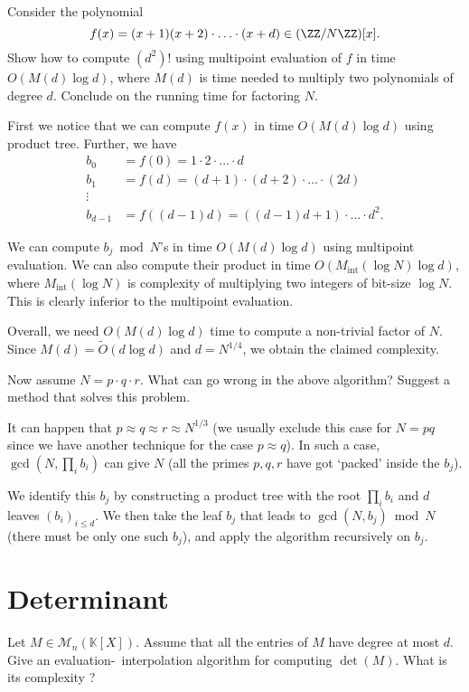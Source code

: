 \documentclass[11pt]{exam}
\theoremstyle{definition}
\begin{document}
{\begin{questions}
  \question Consider the polynomial 
  \[
    f(x) = (x+1)(x+2) \cdot\ldots\cdot  (x+d) \in (\ZZ/N\ZZ)[x].
  \]
  Show how to compute $(d^2)!$ using multipoint evaluation of $f$ in time $O(M(d) \log d)$, where $M(d)$ is time needed to multiply two polynomials of degree $d$. Conclude on the running time for factoring $N$.
  \begin{solution}
    First we notice that we can compute $f(x)$ in time $O(M(d) \log d)$ using product tree. Further, we have
    \begin{align*}
      b_0 & = f(0) = 1 \cdot 2 \cdot\ldots\cdot d \\
      b_1 & = f(d) = (d+1) \cdot (d+2)\cdot \ldots\cdot (2d) \\
      \vdots \\
      b_{d-1} & = f((d-1)d) = ((d-1)d+1)\cdot\ldots\cdot d^2.
    \end{align*}
    
    We can compute $b_j \bmod N$'s in time $O(M(d) \log d)$ using multipoint evaluation. We can also compute their product in time $O(M_{\text{int}}(\log N) \log d)$, where $M_{\text{int}}(\log N)$ is complexity of multiplying two integers of bit-size $\log N$. This is clearly inferior to the multipoint evaluation.
    
    Overall, we need $O(M(d) \log d)$ time to compute a non-trivial factor of $N$. Since $M(d) = \tilde{O}(d \log d)$ and $d=N^{1/4}$, we obtain the claimed complexity.
  \end{solution}

  \question Now assume $N=p\cdot q\cdot r$. What can go wrong in the above algorithm? Suggest a method that solves this problem.
  \begin{solution}
    It can happen that $p \approx q \approx r \approx N^{1/3}$ (we usually exclude this case for $N=pq$ since we have another technique for the case $p \approx q$). In such a case, $\gcd(N, \prod_i b_i)$ can give $N$ (all the primes $p,q,r$ have got `packed' inside the $b_j$). 
			
			We identify this $b_j$ by constructing a product tree with the root $\prod_i b_i$ and $d$ leaves $(b_i)_{i \leq d}$.
			We then take the leaf $b_j$ that leads to $\gcd(N, b_j) \bmod N$(there must be only one such $b_j$), and apply the algorithm recursively on $b_j$. 
 		\end{solution}
\end{questions}

\section{Determinant}
Let $M\in \mathcal{M}_n(\mathbb{K}[X])$. Assume that all the entries of $M$ have degree at most $d$. Give an evaluation-~interpolation algorithm for computing $\det (M)$. What is its complexity ?

}
\end{document}
